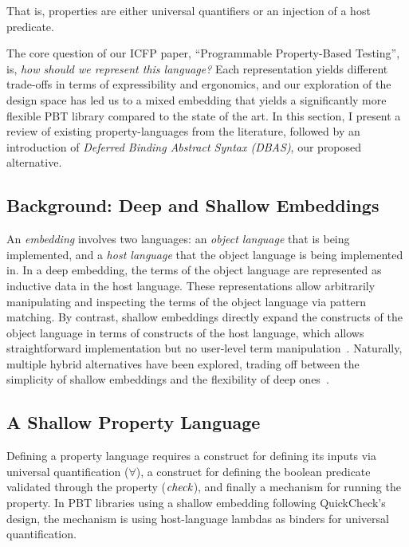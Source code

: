 \noindent That is, properties are either universal quantifiers or an injection of a host
predicate.

The core question of our ICFP paper, ``Programmable Property-Based Testing'', is,
\emph{how should we represent this language?} Each representation yields different
trade-offs in terms of expressibility and ergonomics, and our exploration of the design
space has led us to a mixed embedding that yields a significantly more flexible PBT
library compared to the state of the art. In this section, I present a review of
existing property-languages from the literature, followed by an introduction of
\emph{Deferred Binding Abstract Syntax (DBAS)}, our proposed alternative.

\subsection{Background: Deep and Shallow Embeddings}

An \emph{embedding} involves two languages: an \emph{object language} that is being
implemented, and a \emph{host language} that the object language is being implemented
in. In a deep embedding, the terms of the object language are represented as inductive
data in the host language. These representations allow arbitrarily manipulating and
inspecting the terms of the object language via pattern matching. By contrast, shallow
embeddings directly expand the constructs of the object language in terms of constructs
of the host language, which allows straightforward implementation but no user-level
term manipulation~\cite{boulton1992experience}. Naturally, multiple hybrid alternatives
have been explored, trading off between the simplicity of shallow embeddings and the
flexibility of deep ones~\cite{DeeperShallowEmbeddings,PHOAS,Tlon}.

\subsection{A Shallow Property Language}\label{sec:shallow}

Defining a property language requires a construct for defining its inputs via universal
quantification ($\forall$), a construct for defining the boolean predicate validated
through the property ($\mathit{check}$), and finally a mechanism for running the property. In
PBT libraries using a shallow embedding following QuickCheck's design, the mechanism is
using host-language lambdas as binders for universal quantification.

